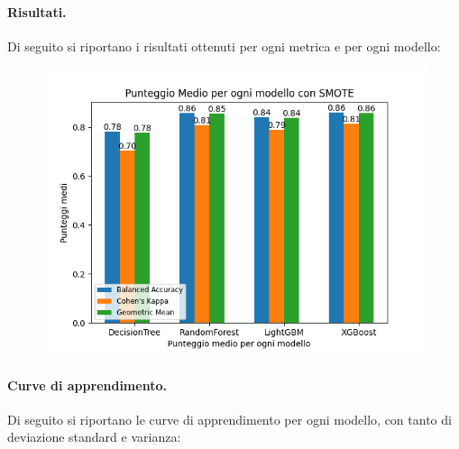 \paragraph{Risultati.} Di seguito si riportano i risultati ottenuti per ogni metrica e per ogni modello:

\begin{figure}[H]
    \centering
    \includegraphics[scale=0.7]{img/smote_metrics.png}
\end{figure}



\paragraph{Curve di apprendimento.} Di seguito si riportano le curve di apprendimento per ogni modello, con tanto di deviazione standard e varianza:

